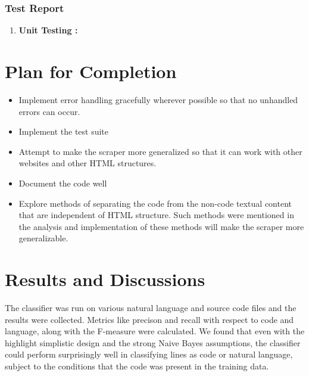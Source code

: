 \documentclass[12pt]{scrreprt}
\begin{document}
\subsection{Test Report}

\begin{enumerate}
    \item \textbf{Unit Testing : }
    
\end{enumerate}






\chapter{Plan for Completion}


\begin{itemize}
    \item Implement error handling gracefully wherever possible so that no unhandled errors can occur.
    \item Implement the test suite
    \item Attempt to make the scraper more generalized so that it can work with other websites and other HTML structures.
    \item Document the code well
    \item Explore methods of separating the code from the non-code textual content that are independent of HTML structure. Such methods were mentioned in the analysis and implementation of these methods will make the scraper more generalizable. 
\end{itemize}


\chapter{Results and Discussions}

The classifier was run on various natural language and source code files and the results were collected. Metrics like precison and recall with respect to code and language, along with the F-measure were calculated. We found that even with the highlight simplistic design and the strong Naive Bayes assumptions, the classifier could perform surprisingly well in classifying lines as code or natural language, subject to the conditions that the code was present in the training data.
\end{document}
